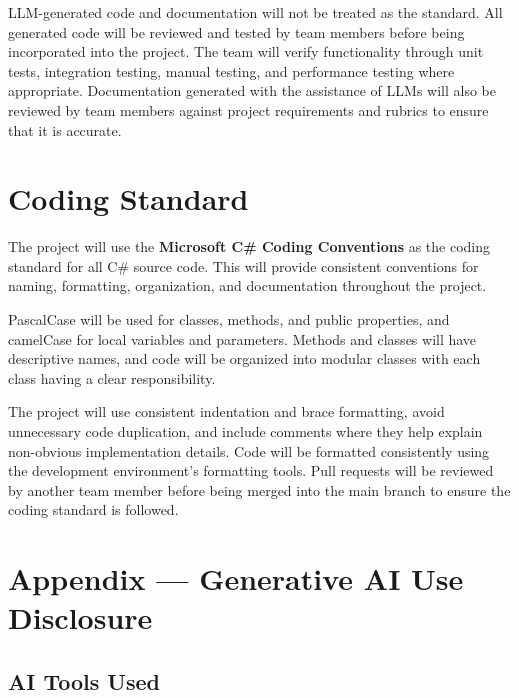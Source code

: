 \documentclass{article}
\begin{document}
\vspace{0.75em}

\noindent LLM-generated code and documentation will not be treated as the standard. All generated code will be reviewed and tested by team members before being incorporated into the project. The team will verify functionality through unit tests, integration testing, manual testing, and performance testing where appropriate. Documentation generated with the assistance of LLMs will also be reviewed by team members against project requirements and rubrics to ensure that it is accurate.

\section{Coding Standard}

The project will use the \textbf{Microsoft C\# Coding Conventions} as the coding standard for all C\# source code. This will provide consistent conventions for naming, formatting, organization, and documentation throughout the project.

\vspace{1em}

\noindent PascalCase will be used for classes, methods, and public properties, and camelCase for local variables and parameters. Methods and classes will have descriptive names, and code will be organized into modular classes with each class having a clear responsibility.

\vspace{1em}

\noindent The project will use consistent indentation and brace formatting, avoid unnecessary code duplication, and include comments where they help explain non-obvious implementation details. Code will be formatted consistently using the development environment's formatting tools. Pull requests will be reviewed by another team member before being merged into the main branch to ensure the coding standard is followed.

\newpage{}

\section{Appendix --- Generative AI Use Disclosure}

\subsection{AI Tools Used}
\end{document}
